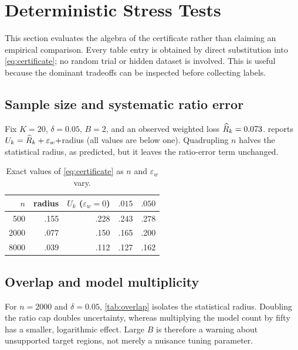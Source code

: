 \section{Deterministic Stress Tests}
\label{sec:experiments}

This section evaluates the algebra of the certificate rather than claiming an
empirical comparison.  Every table entry is obtained by direct substitution into
\cref{eq:certificate}; no random trial or hidden dataset is involved.  This is
useful because the dominant tradeoffs can be inspected before collecting labels.

\subsection{Sample size and systematic ratio error}

Fix $K=20$, $\delta=0.05$, $B=2$, and an observed weighted loss
$\widehat R_k=0.073$.   reports
$U_k=\widehat R_k+\varepsilon_w+$radius (all values are below one).  Quadrupling $n$
halves the statistical radius, as predicted, but it leaves the ratio-error term
unchanged.

\begin{table}[t]
\centering
\caption{Exact values of \cref{eq:certificate} as $n$ and
$\varepsilon_w$ vary.}
\label{tab:sample-size}
\small
\setlength{\tabcolsep}{4.4pt}
\begin{tabular}{rrrrr}
\toprule
$n$ & radius & $U_k$ ($\varepsilon_w=0$) & $.015$ & $.050$ \\
\midrule
  500 & .155 & .228 & .243 & .278 \\
 2000 & .077 & .150 & .165 & .200 \\
 8000 & .039 & .112 & .127 & .162 \\
\bottomrule
\end{tabular}
\end{table}

\subsection{Overlap and model multiplicity}

For $n=2000$ and $\delta=0.05$, \cref{tab:overlap} isolates the statistical
radius.  Doubling the ratio cap doubles uncertainty, whereas multiplying the model
count by fifty has a smaller, logarithmic effect.  Large $B$ is therefore a warning
about unsupported target regions, not merely a nuisance tuning parameter.

